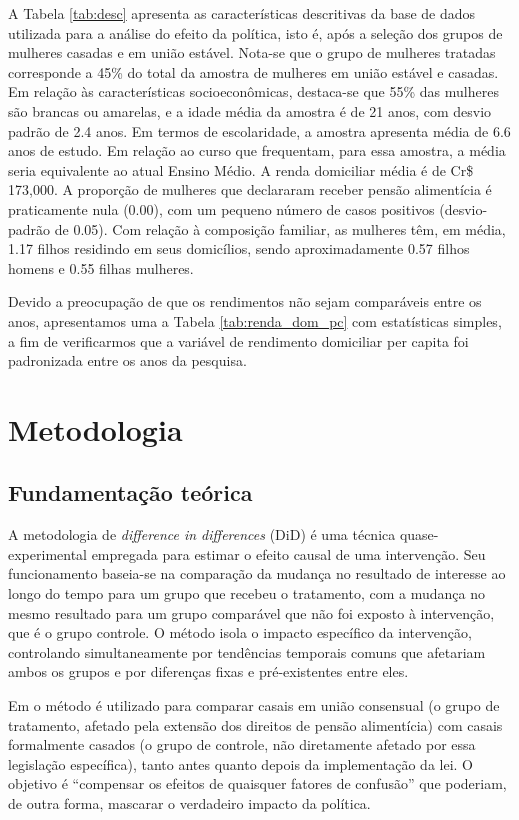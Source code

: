 \documentclass[12pt,oneside,a4paper]{article}
\begin{document}
A Tabela \ref{tab:desc} apresenta as características descritivas da base de dados utilizada para a análise do efeito da política, isto é, após a seleção dos grupos de mulheres casadas e em união estável. Nota-se que o grupo de mulheres tratadas corresponde a 45\% do total da amostra de mulheres em união estável e casadas. Em relação às características socioeconômicas, destaca-se que 55\% das mulheres são brancas ou amarelas, e a idade média da amostra é de 21 anos, com desvio padrão de 2.4 anos. Em termos de escolaridade, a amostra apresenta média de 6.6 anos de estudo. Em relação ao curso que frequentam, para essa amostra, a média seria equivalente ao atual Ensino Médio. A renda domiciliar média é de Cr\$ 173,000. A proporção de mulheres que declararam receber pensão alimentícia é praticamente nula (0.00), com um pequeno número de casos positivos (desvio-padrão de 0.05). Com relação à composição familiar, as mulheres têm, em média, 1.17 filhos residindo em seus domicílios, sendo aproximadamente 0.57 filhos homens e 0.55 filhas mulheres.

 
Devido a preocupação de que os rendimentos não sejam comparáveis entre os anos, apresentamos uma a Tabela \ref{tab:renda_dom_pc} com estatísticas simples, a fim de verificarmos que a variável de rendimento domiciliar per capita foi padronizada entre os anos da pesquisa.

\section{Metodologia}

\subsection{Fundamentação teórica}

A metodologia de \textit{difference in differences} (DiD) é uma técnica quase-experimental empregada para estimar o efeito causal de uma intervenção. Seu funcionamento baseia-se na comparação da mudança no resultado de interesse ao longo do tempo para um grupo que recebeu o tratamento, com a mudança no mesmo resultado para um grupo comparável que não foi exposto à intervenção, que é o grupo controle. O método isola o impacto específico da intervenção, controlando simultaneamente por tendências temporais comuns que afetariam ambos os grupos e por diferenças fixas e pré-existentes entre eles. 

Em  o método é utilizado para comparar casais em união consensual (o grupo de tratamento, afetado pela extensão dos direitos de pensão alimentícia) com casais formalmente casados (o grupo de controle, não diretamente afetado por essa legislação específica), tanto antes quanto depois da implementação da lei. O objetivo é ``compensar os efeitos de quaisquer fatores de confusão'' que poderiam, de outra forma, mascarar o verdadeiro impacto da política.
\end{document}
